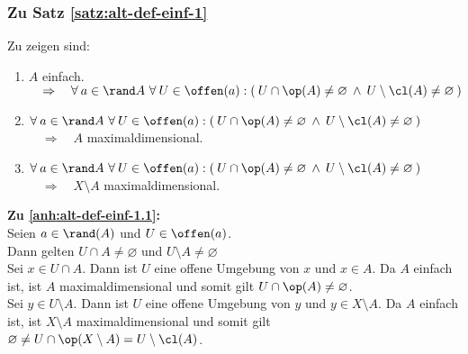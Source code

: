 \subsubsection{Zu Satz \ref{satz:alt-def-einf-1}}\label{anh:alt-def-einf-1}
    Zu zeigen sind:
    \begin{enumerate}
        \item \label{anh:alt-def-einf-1.1} $A$ einfach. \\
            $\quad \Rightarrow \quad \forall\: a \in \rand A\ \forall\: U \in \offen(a): (\: U \cap \op(A) \neq \varnothing \:\land\: U \setminus \cl(A) \neq \varnothing \:)$
        \item \label{anh:alt-def-einf-1.2} $\forall\: a \in \rand A\ \forall\: U \in \offen(a): (\: U \cap \op(A) \neq \varnothing \:\land\: U \setminus \cl(A) \neq \varnothing \:)$ \\
            $\quad \Rightarrow \quad A$ maximaldimensional.
        \item \label{anh:alt-def-einf-1.3} $\forall\: a \in \rand A\ \forall\: U \in \offen(a): (\: U \cap \op(A) \neq \varnothing \:\land\: U \setminus \cl(A) \neq \varnothing \:)$ \\
            $\quad \Rightarrow \quad X \setminus A$ maximaldimensional.
    \end{enumerate}
%
    \noindent
    \textbf{Zu \ref{anh:alt-def-einf-1.1}: }\\
        Seien ${a \in \rand(A)}$ und $U \in \offen(a)$.\\
        Dann gelten ${U \cap A \neq \varnothing}$ und ${U \setminus A \neq \varnothing}$\\
        Sei ${x \in U \cap A}$. Dann ist $U$ eine offene Umgebung von $x$ und $x \in A$. Da $A$ einfach ist, ist $A$ maximaldimensional und somit gilt $U \cap \op(A) \neq \varnothing$.\\
        Sei ${y \in U \setminus A}$. Dann ist $U$ eine offene Umgebung von $y$ und ${y \in X \setminus A}$.
        Da $A$ einfach ist, ist ${X \setminus A}$ maximaldimensional und somit gilt $\varnothing \neq U \cap \op(X \setminus A) = U \setminus \cl(A)$.\\ \
    
